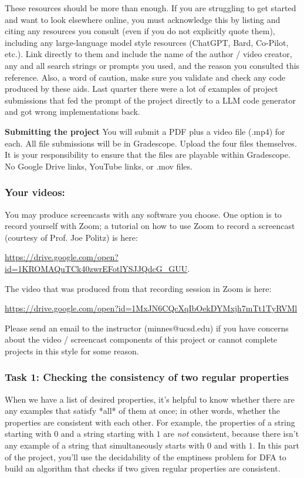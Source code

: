 These resources should be more than enough.
If you are struggling to get started and want to look elsewhere online, 
you must acknowledge this by listing and citing any resources you consult 
(even if you do not explicitly quote them), including any large-language model style resources (ChatGPT, Bard, Co-Pilot, etc.). 
Link directly to them and include the name of the author / video creator, 
any and all search strings or prompts you used, and the reason you consulted this reference.  Also, a word of caution, make sure you validate and check 
any code produced by these aids. Last quarter there were a lot of examples
of project submissions that fed the prompt of the project 
directly to a LLM code  generator and got wrong implementations back.

{\bf Submitting the project} You will submit a PDF plus a video file (.mp4) for each. All file submissions will be in Gradescope. Upload the four files themselves. It is your responsibility to ensure that the files are playable within Gradescope. No Google Drive links, YouTube links, or .mov files.

\newpage
\subsubsection*{Your videos:} You may produce screencasts 
with any software you choose. 
One option is to record yourself with Zoom; a tutorial on how to use 
Zoom to record a 
screencast (courtesy of Prof. Joe Politz)  is here: 

\url{https://drive.google.com/open?id=1KROMAQuTCk40zwrEFotlYSJJQdcG_GUU}.

The video that was produced from that recording session in Zoom is here:

\url{https://drive.google.com/open?id=1MxJN6CQcXqIbOekDYMxjh7mTt1TyRVMl}

Please send an email to the instructor 
(minnes@ucsd.edu) if you have 
concerns about  the video / screencast components of this project or 
cannot complete projects in this style for some reason.

\vspace{-20pt}

\subsubsection*{Task 1: Checking the consistency of two regular properties}

When we have a list of desired properties, it's helpful to know whether there 
are any examples that satisfy *all* of them at once; 
in other words, whether the  properties are 
consistent with each other. For example, the properties of 
a string starting with $0$ and a string starting with $1$ are {\it not} consistent, 
because there isn't any example of a string that simultaneously starts with $0$ and with $1$.
In this part of the 
project, you'll use the decidability of the emptiness problem for DFA to 
build an algorithm that checks if two given regular properties are consistent.

